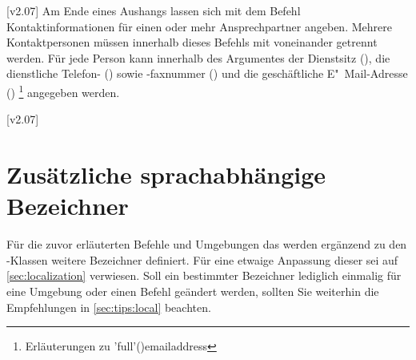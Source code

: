 \begin{DeclareEntity}{}
\begin{Declaration}
\begin{Declaration}
\begin{Declaration}
\begin{Declaration}
[v2.07]
Am Ende eines Aushangs lassen sich mit dem Befehl  
Kontaktinformationen für einen oder mehr Ansprechpartner angeben. Mehrere 
Kontaktpersonen müssen innerhalb dieses Befehls mit  voneinander 
getrennt werden. Für jede Person kann innerhalb des Argumentes der Dienstsitz 
(), die dienstliche Telefon- () sowie -faxnummer
() und die geschäftliche E"~Mail-Adresse ()%
\footnote{Erläuterungen zu \Macro*'full'(){emailaddress}}
angegeben werden.
\end{Declaration}
\end{Declaration}
\end{Declaration}
\end{Declaration}
%

[v2.07]



\section{%
  Zusätzliche sprachabhängige Bezeichner%
}

Für die zuvor erläuterten Befehle und Umgebungen das werden ergänzend zu den 
\TUDScript-Klassen weitere Bezeichner definiert. Für eine etwaige Anpassung 
dieser sei auf \autoref{sec:localization} verwiesen. Soll ein bestimmter 
Bezeichner lediglich einmalig für eine Umgebung oder einen Befehl geändert 
werden, sollten Sie weiterhin die Empfehlungen in \autoref{sec:tips:local} 
beachten.


\end{DeclareEntity}
